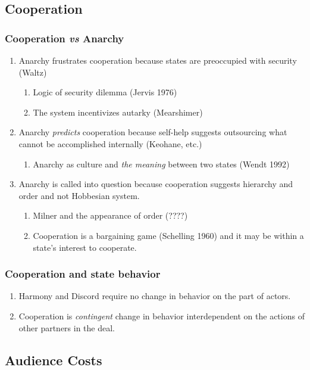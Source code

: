 \documentclass[11pt]{article}
\begin{document}
\subsection{Cooperation}
\label{sec-1-6}
\subsubsection{Cooperation \emph{vs} Anarchy}
\label{sec-1-6-1}
\begin{enumerate}
\item Anarchy frustrates cooperation because states are preoccupied with
security (Waltz)
\begin{enumerate}
\item Logic of security dilemma (Jervis 1976)
\item The system incentivizes autarky (Mearshimer)
\end{enumerate}
\item Anarchy \emph{predicts} cooperation because self-help suggests
outsourcing what cannot be accomplished internally (Keohane, etc.)
\begin{enumerate}
\item Anarchy as culture and \emph{the meaning} between two states (Wendt 1992)
\end{enumerate}
\item Anarchy is called into question because cooperation suggests
hierarchy and order and not Hobbesian system.
\begin{enumerate}
\item Milner and the appearance of order (????)
\item Cooperation is a bargaining game (Schelling 1960) and it may be
within a state's interest to cooperate.
\end{enumerate}
\end{enumerate}
\subsubsection{Cooperation and state behavior}
\label{sec-1-6-2}
\begin{enumerate}
\item Harmony and Discord require no change in behavior on the part of actors.
\item Cooperation is \emph{contingent} change in behavior interdependent on
the actions of other partners in the deal.
\end{enumerate}
\subsection{Audience Costs}
\label{sec-1-7}
\end{document}
